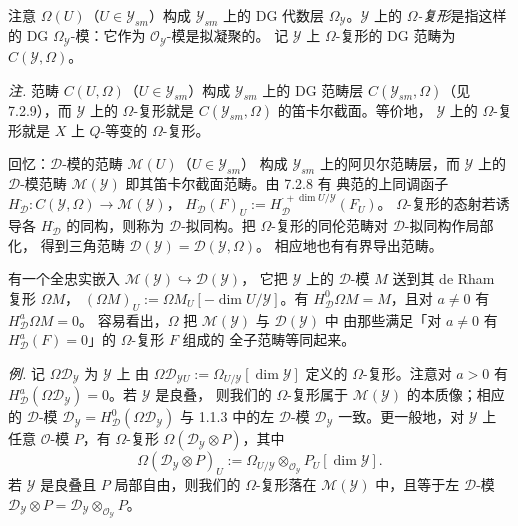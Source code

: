 
注意 $\Omega(U)$（$U\in\mathcal{Y}_{sm}$）构成 $\mathcal{Y}_{sm}$ 上的 DG 代数层
$\Omega_{\mathcal{Y}}$。$\mathcal{Y}$ 上的 \emph{$\Omega$-复形}是指这样的
DG $\Omega_{\mathcal{Y}}$-模：它作为 $\mathcal{O}_{\mathcal{Y}}$-模是拟凝聚的。
记 $\mathcal{Y}$ 上 $\Omega$-复形的 DG 范畴为 $C(\mathcal{Y},\Omega)$。

\emph{注.} 范畴 $C(U,\Omega)$（$U\in\mathcal{Y}_{sm}$）构成 $\mathcal{Y}_{sm}$
上的 DG 范畴层 $C(\mathcal{Y}_{sm},\Omega)$（见 7.2.9），而 $\mathcal{Y}$ 上的
$\Omega$-复形就是 $C(\mathcal{Y}_{sm},\Omega)$ 的笛卡尔截面。等价地，
$\mathcal{Y}$ 上的 $\Omega$-复形就是 $X$ 上 $Q$-等变的 $\Omega$-复形。

 回忆：$\mathcal{D}$-模的范畴 $\mathcal{M}(U)$（$U\in\mathcal{Y}_{sm}$）
构成 $\mathcal{Y}_{sm}$ 上的阿贝尔范畴层，而 $\mathcal{Y}$ 上的
$\mathcal{D}$-模范畴 $\mathcal{M}(\mathcal{Y})$ 即其笛卡尔截面范畴。由 7.2.8 有
典范的上同调函子
$H_{\mathcal{D}}^{\cdot}:C(\mathcal{Y},\Omega)\to\mathcal{M}(\mathcal{Y})$，
$H_{\mathcal{D}}^{\cdot}(F)_U:=H_{\mathcal{D}}^{\cdot+\dim U/\mathcal{Y}}(F_U)$。
$\Omega$-复形的态射若诱导各 $H_{\mathcal{D}}^{\cdot}$ 的同构，则称为
$\mathcal{D}$-拟同构。把 $\Omega$-复形的同伦范畴对 $\mathcal{D}$-拟同构作局部化，
得到三角范畴 $\mathcal{D}(\mathcal{Y})=\mathcal{D}(\mathcal{Y},\Omega)$。
相应地也有有界导出范畴。

有一个全忠实嵌入 $\mathcal{M}(\mathcal{Y})\hookrightarrow\mathcal{D}(\mathcal{Y})$，
它把 $\mathcal{Y}$ 上的 $\mathcal{D}$-模 $M$ 送到其 de Rham 复形 $\Omega M$，
$(\Omega M)_U:=\Omega M_U[-\dim U/\mathcal{Y}]$。有
$H_{\mathcal{D}}^0\Omega M=M$，且对 $a\neq0$ 有 $H_{\mathcal{D}}^a\Omega M=0$。
容易看出，$\Omega$ 把 $\mathcal{M}(\mathcal{Y})$ 与 $\mathcal{D}(\mathcal{Y})$ 中
由那些满足「对 $a\neq0$ 有 $H_{\mathcal{D}}^a(F)=0$」的 $\Omega$-复形 $F$ 组成的
全子范畴等同起来。

 \emph{例.} 记 $\Omega\mathcal{D}_{\mathcal{Y}}$ 为 $\mathcal{Y}$ 上
由 $\Omega\mathcal{D}_{\mathcal{Y}U}:=\Omega_{U/\mathcal{Y}}[\dim\mathcal{Y}]$
定义的 $\Omega$-复形。注意对 $a>0$ 有
$H_{\mathcal{D}}^a(\Omega\mathcal{D}_{\mathcal{Y}})=0$。若 $\mathcal{Y}$ 是良叠，
则我们的 $\Omega$-复形属于 $\mathcal{M}(\mathcal{Y})$ 的本质像；相应的
$\mathcal{D}$-模 $\mathcal{D}_{\mathcal{Y}}
=H_{\mathcal{D}}^0(\Omega\mathcal{D}_{\mathcal{Y}})$ 与 1.1.3 中的左
$\mathcal{D}$-模 $\mathcal{D}_{\mathcal{Y}}$ 一致。更一般地，对 $\mathcal{Y}$ 上
任意 $\mathcal{O}$-模 $P$，有 $\Omega$-复形
$\Omega(\mathcal{D}_{\mathcal{Y}}\otimes P)$，其中
\[
\Omega(\mathcal{D}_{\mathcal{Y}}\otimes P)_U:=
\Omega_{U/\mathcal{Y}}\otimes_{\mathcal{O}_{\mathcal{Y}}}P_U[\dim\mathcal{Y}].
\]
若 $\mathcal{Y}$ 是良叠且 $P$ 局部自由，则我们的 $\Omega$-复形落在
$\mathcal{M}(\mathcal{Y})$ 中，且等于左 $\mathcal{D}$-模
$\mathcal{D}_{\mathcal{Y}}\otimes P
=\mathcal{D}_{\mathcal{Y}}\otimes_{\mathcal{O}_{\mathcal{Y}}}P$。

